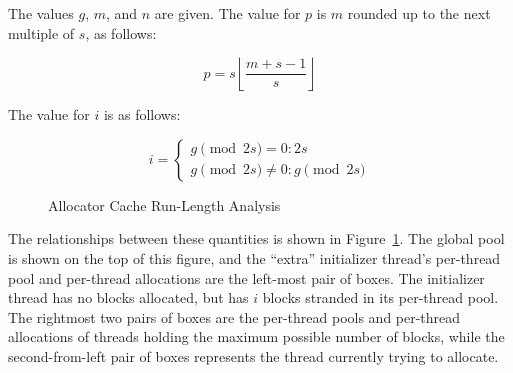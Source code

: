 \begin{enumerate}
	The values $g$, $m$, and $n$ are given.  The value for $p$ is
	$m$ rounded up to the next multiple of $s$, as follows:

	\begin{equation}
		p = s \left \lfloor \frac{m + s - 1}{s} \right \rfloor
	\label{sec:SMPdesign:p}
	\end{equation}

	The value for $i$ is as follows:

	\begin{equation}
		i = \left \{
			\begin{array}{l}
				g \pmod{2 s} = 0: 2 s \\
				g \pmod{2 s} \ne 0: g \pmod{2 s}
			\end{array}
		    \right .
	\label{sec:SMPdesign:i}
	\end{equation}

	\begin{figure}[tb]
	\begin{center}
	\end{center}
	\caption{Allocator Cache Run-Length Analysis}
	\label{fig:SMPdesign:Allocator Cache Run-Length Analysis}
	\end{figure}

	The relationships between these quantities is shown in
	Figure~\ref{fig:SMPdesign:Allocator Cache Run-Length Analysis}.
	The global pool is shown on the top of this figure, and
	the ``extra'' initializer thread's per-thread pool and
	per-thread allocations are the left-most pair of boxes.
	The initializer thread has no blocks allocated, but has
	$i$ blocks stranded in its per-thread pool.
	The rightmost two pairs of boxes are the per-thread pools and
	per-thread allocations of threads holding the maximum possible
	number of blocks, while the second-from-left pair of boxes
	represents the thread currently trying to allocate.


\end{enumerate}
